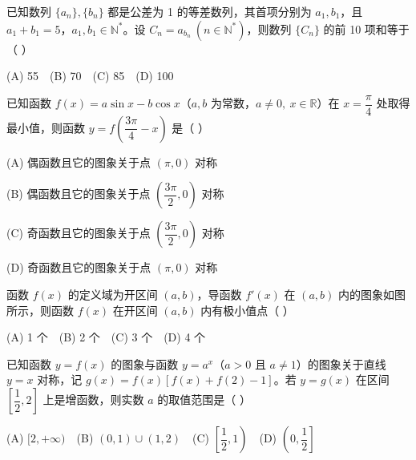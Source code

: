 \begin{question}

已知数列 \(\{a_n\},\{b_n\}\) 都是公差为 1 的等差数列，其首项分别为 \(a_1,b_1\)，且 \(a_1+b_1=5\)，\(a_1,b_1\in\mathbb N^*\)。设 \(C_n=a_{b_n}\ (n\in\mathbb N^*)\)，则数列 \(\{C_n\}\) 的前 10 项和等于（  ）

(A) 55　(B) 70　(C) 85　(D) 100

\end{question}
\begin{question}

已知函数 \(f(x)=a\sin x-b\cos x\)（\(a,b\) 为常数，\(a\ne0,\ x\in\mathbb R\)）在 \(x=\dfrac{\pi}{4}\) 处取得最小值，则函数 \(y=f\left(\dfrac{3\pi}{4}-x\right)\) 是（  ）

(A) 偶函数且它的图象关于点 \((\pi,0)\) 对称

(B) 偶函数且它的图象关于点 \(\left(\dfrac{3\pi}{2},0\right)\) 对称

(C) 奇函数且它的图象关于点 \(\left(\dfrac{3\pi}{2},0\right)\) 对称

(D) 奇函数且它的图象关于点 \((\pi,0)\) 对称

\Needspace{0.4\textheight}
\end{question}
\begin{question}

函数 \(f(x)\) 的定义域为开区间 \((a,b)\)，导函数 \(f'(x)\) 在 \((a,b)\) 内的图象如图所示，则函数 \(f(x)\) 在开区间 \((a,b)\) 内有极小值点（  ）

(A) 1 个　(B) 2 个　(C) 3 个　(D) 4 个
\nopagebreak[4]
\begin{center}\end{center}
\nopagebreak[4]
\end{question}
\begin{question}

已知函数 \(y=f(x)\) 的图象与函数 \(y=a^x\)（\(a>0\) 且 \(a\ne1\)）的图象关于直线 \(y=x\) 对称，记 \(g(x)=f(x)[f(x)+f(2)-1]\)。若 \(y=g(x)\) 在区间 \(\left[\dfrac12,2\right]\) 上是增函数，则实数 \(a\) 的取值范围是（  ）

(A) \([2,+\infty)\)　(B) \((0,1)\cup(1,2)\)　(C) \(\left[\dfrac12,1\right)\)　(D) \(\left(0,\dfrac12\right]\)

\end{question}

